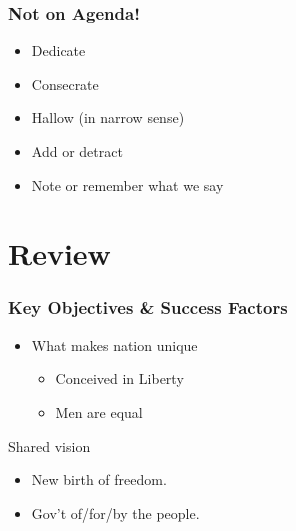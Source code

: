 \documentclass{beamer}
\begin{document}
\begin{frame}
\frametitle{Not on Agenda!}
  \begin{itemize}
  \item Dedicate
  \item Consecrate
  \item Hallow (in narrow sense)
  \item Add or detract
  \item Note or remember what we say
  \end{itemize}
\end{frame}

\section{Review}

\begin{frame}

\frametitle{Key Objectives \& Success Factors}

\begin{itemize}

\item What makes nation unique

\begin{itemize}

\item Conceived in Liberty
\item Men are equal

\end{itemize}
  
\end{itemize}

\begin{block}{Shared vision}

\begin{itemize}

  \item New birth of freedom.
  \item Gov't of/for/by the people.

\end{itemize}

\end{block}
  
\end{frame}
\end{document}
